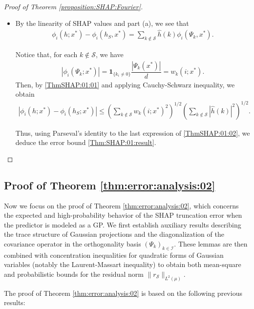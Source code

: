\documentclass[letterpaper,11pt]{article}
\numberwithin{equation}{section}
\renewcommand{\leq}{\leqslant}
\numberwithin{equation}{section}
\begin{document}
\begin{proof}[Proof of Theorem \ref{proposition:SHAP:Fourier}]
\begin{itemize}
    \item[(b)] By the linearity of SHAP values and part (a), we see that 
    \begin{align}
        \label{ThmSHAP:01:01}
        \phi_i(h;x^*)-\phi_i(h_S,x^*)=\sum_{k\notin \mathcal{S}} \hat{h}(k) \phi_i(\Psi_k,x^*).
    \end{align}

    Notice that, for each $k\notin \mathcal{S}$, we have
    \begin{align*}
        |\phi_i(\Psi_k;x^*)|=\bm{1}_{\{k_i\neq 0\}} \dfrac{|\Psi_k(x^*)|}{d}=w_k(i;x^*). 
    \end{align*}
    Then, by \eqref{ThmSHAP:01:01} and applying Cauchy-Schwarz inequality, we obtain
    \begin{align}
        \label{ThmSHAP:01:02}
        |\phi_i(h;x^*) - \phi_i(h_S;x^*)|\leq \left( \sum_{k\notin \mathcal{S}} w_k(i;x^*)^2 \right)^{1/2} \left( \sum_{k\notin \mathcal{S}} |\hat{h}(k)|^2\right)^{1/2}.
    \end{align}

    Thus, using Parseval's identity to the last expression of \eqref{ThmSHAP:01:02}, we deduce the error bound \eqref{Thm:SHAP:01:result}. 
    \end{itemize}
\end{proof}


\subsection{Proof of Theorem \ref{thm:error:analysis:02}}

Now we focus on the proof of Theorem \ref{thm:error:analysis:02}, which concerns the expected and high-probability behavior of the SHAP truncation error when the predictor is modeled as a GP. We first establish auxiliary results describing the trace structure of Gaussian projections and the diagonalization of the covariance operator in the orthogonality basis $(\Psi_k)_{k\in \mathcal{I}}$. These lemmas are then combined with concentration inequalities for quadratic forms of Gaussian variables (notably the Laurent-Massart inequality) to obtain both mean-square and probabilistic bounds for the residual norm $\|r_{\mathcal{S}}\|_{L^2(\mu)}$.

The proof of Theorem \ref{thm:error:analysis:02} is based on the following previous results:
\end{document}
